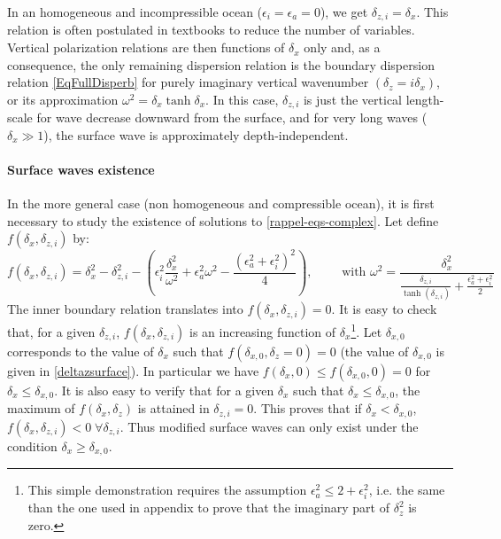 In an homogeneous and incompressible ocean ($\epsilon_i=\epsilon_a=0$), we get $\delta_{z,i}=\delta_x$. This relation is often postulated in textbooks to reduce the number of variables. Vertical polarization relations are then functions of $\delta_x$ only \citep{gill_1982} and, as a consequence, the only remaining dispersion relation is the boundary dispersion relation \ref{EqFullDisperb} for purely imaginary vertical wavenumber $(\delta_z=i\delta_x)$, or its approximation  $\omega^2=\delta_x \tanh \delta_x$. In this case, $\delta_{z,i}$ is just the vertical length-scale for wave decrease downward from the surface, and for very long waves ($\delta_x \gg 1$), the surface wave is approximately depth-independent.
%
\paragraph{Surface waves existence} In the more general case (non homogeneous and compressible ocean), it is first necessary to study the existence of solutions to \ref{rappel-eqs-complex}. Let define
$f(\delta_x, \delta_{z,i})$ by:
\[
f(\delta_x, \delta_{z,i})=\delta_x^2-\delta_{z,i}^2-\left(
\epsilon_i^2\frac{\delta_x^2}
{\omega^2}+\epsilon_a^2\omega^2-\frac{(\epsilon_a^2+\epsilon_i^2)^2}{4}
\right),
\qquad \mbox{ with }\omega^2=\frac{\delta_x^2}
{\frac{\delta_{z,i}}{\tanh(\delta_{z,i})}+\frac{\epsilon_a^2+\epsilon_i^2}{2}}
\]
The inner boundary relation translates into $f(\delta_x,\delta_{z,i})=0$. It is easy to check that, for a given $\delta_{z,i}$, $f(\delta_x,\delta_{z,i})$ is an increasing function of $\delta_x$\footnote{This simple demonstration requires the assumption $\epsilon_a^2 \le 2 + \epsilon_i^2$, i.e. the same than the one used in appendix to prove that the imaginary part of $\delta_z^2$ is zero.}. Let $\delta_{x,0}$ corresponds to the value of $\delta_x$ such that $f(\delta_{x,0},\delta_z=0)=0$ (the value of $\delta_{x,0}$ is given in \ref{deltazsurface}).
In particular we have $f(\delta_x,0)\le f(\delta_{x,0},0)=0$ for $\delta_x \le \delta_{x,0}$. It is also easy to verify that for a given $\delta_x$ such that $\delta_x \le \delta_{x,0}$, the maximum of $f(\delta_x,\delta_z)$ is attained in $\delta_{z,i}=0$. This proves that if $\delta_x < \delta_{x,0}$, $f(\delta_x,\delta_{z,i}) < 0\; \forall \delta_{z,i}$. Thus modified surface waves can only exist under the condition $\delta_x \ge \delta_{x,0}$.
%

